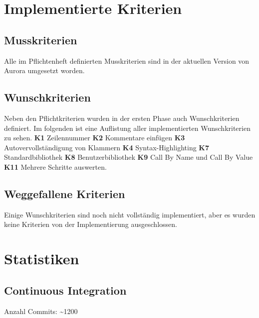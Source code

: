 \documentclass[parskip=full,11pt,twoside]{scrartcl}
\begin{document}
\newpage


\section{Implementierte Kriterien}

\subsection{Musskriterien}
Alle im Pflichtenheft definierten Musskriterien sind in der aktuellen Version von Aurora umgesetzt worden.

\subsection{Wunschkriterien}
Neben den Pflichtkriterien wurden in der ersten Phase auch Wunschkriterien definiert.
Im folgenden ist eine Auflistung aller implementierten Wunschkriterien zu sehen.
\newline
\newline
\textbf{K1} Zeilennummer
\newline
\textbf{K2} Kommentare einfügen
\newline
\textbf{K3} Autovervollständigung von Klammern
\newline
\textbf{K4} Syntax-Highlighting
\newline
\textbf{K7} Standardbibliothek
\newline
\textbf{K8} Benutzerbibliothek
\newline
\textbf{K9} Call By Name und Call By Value
\newline
\textbf{K11} Mehrere Schritte auswerten.
\newline

\subsection{Weggefallene Kriterien}
Einige Wunschkriterien sind noch nicht vollständig implementiert, aber es wurden keine Kriterien von der Implementierung ausgeschlossen.
\newpage


\section{Statistiken}

\subsection{Continuous Integration}
Anzahl Commits: \textasciitilde  1200\newline
\end{document}

